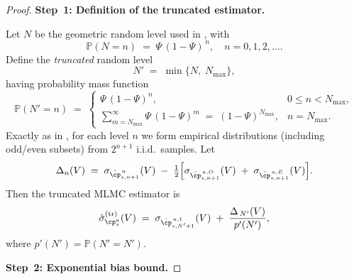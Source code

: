 \begin{proof}

\textbf{Step~1: Definition of the truncated estimator.}

Let $N$ be the geometric random level used in \citep{wang2023model}, with
\begin{equation}
  \mathbb{P}(N=n)
  \;=\;
  \Psi\,(1-\Psi)^{\,n}, 
  \quad
  n=0,1,2,\dots.
\end{equation}
Define the \emph{truncated} random level 
\begin{equation}
  N' \;=\;\min\{N,\;N_{\max}\},
\end{equation}
having probability mass function
\begin{equation}
  \mathbb{P}(N' = n)
  \;=\;
  \begin{cases}
    \Psi\,(1-\Psi)^n,
    &0\le n<N_{\max},\\[6pt]
    \sum_{m=N_{\max}}^{\infty}\!\Psi\,(1-\Psi)^{m}
    \;=\;(1-\Psi)^{N_{\max}},
    &n=N_{\max}.
  \end{cases}
\end{equation}
Exactly as in \citep{wang2023model}, for each level $n$ we form empirical distributions (including odd/even subsets) from $2^{n+1}$ i.i.d.\ samples.  Let
\begin{equation}
  \Delta_n(V)
  \;=\;
  \sigma_{\hat{\cp}^{\,a}_{s,n+1}}(V)
  \;-\;
  \tfrac12\Bigl[
    \sigma_{\hat{\cp}^{\,a,O}_{s,n+1}}(V)
    \;+\;
    \sigma_{\hat{\cp}^{\,a,E}_{s,n+1}}(V)
  \Bigr].
\end{equation}
Then the truncated MLMC estimator is
\begin{equation}
  \hat{\sigma}_{\cp^a_s}^{(\mathrm{tr})}(V)
  \;=\;
  \sigma_{\hat{\cp}^{\,a,1}_{s,N'+1}}(V)
  \;+\;
  \frac{\Delta_{\,N'}(V)}{p'(N')},
\end{equation}
where $p'(N')=\mathbb{P}(N'=N')$.  

\medskip

\textbf{Step~2: Exponential bias bound.}


\end{proof}
